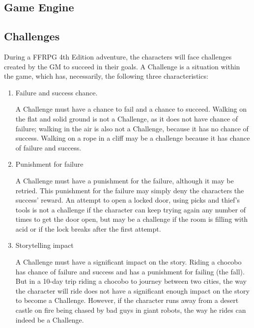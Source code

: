 \begin{multicols}{2}

\section{Game Engine}

\subsection{Challenges}
During a FFRPG 4th Edition adventure, the
characters will face challenges created by the GM
to succeed in their goals. A Challenge is a situation
within the game, which has, necessarily, the
following three characteristics:

\begin{enumerate}[label=\alph*]
\item Failure and success chance.

A Challenge must have a chance to fail and a chance to succeed.
Walking on the flat and solid ground is not a
Challenge, as it does not have chance of failure;
walking in the air is also not a Challenge, because
it has no chance of success. Walking on a rope in a
cliff may be a challenge because it has chance of
failure and success.

\item Punishment for failure

A Challenge must
have a punishment for the failure, although it may
be retried. This punishment for the failure may
simply deny the characters the success’ reward. An
attempt to open a locked door, using picks and
thief’s tools is not a challenge if the character can
keep trying again any number of times to get the
door open, but may be a challenge if the room is
filling with acid or if the lock breaks after the first
attempt.

\item Storytelling impact

A Challenge must
have a significant impact on the story. Riding a
chocobo has chance of failure and success and has
a punishment for failing (the fall). But in a 10-day
trip riding a chocobo to journey between two cities,
the way the character will ride does not have a
significant enough impact on the story to become
a Challenge. However, if the character runs away
from a desert castle on fire being chased by bad
guys in giant robots, the way he rides can indeed
be a Challenge.

\end{enumerate}


\end{multicols}

